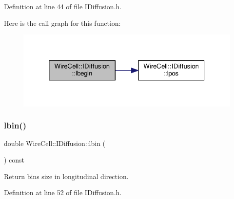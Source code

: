Definition at line 44 of file I\+Diffusion.\+h.

Here is the call graph for this function\+:
\nopagebreak
\begin{figure}[H]
\begin{center}
\leavevmode
\includegraphics[width=320pt]{class_wire_cell_1_1_i_diffusion_a554ef0f091287ae6e9f707a961f5a53c_cgraph}
\end{center}
\end{figure}
\mbox{\label{class_wire_cell_1_1_i_diffusion_ac82a15088681538902392c880666aa3e}} 
\subsubsection{\texorpdfstring{lbin()}{lbin()}}
{\footnotesize\ttfamily double Wire\+Cell\+::\+I\+Diffusion\+::lbin (\begin{DoxyParamCaption}{ }\end{DoxyParamCaption}) const\hspace{0.3cm}{\ttfamily [inline]}}



Return bins size in longitudinal direction. 



Definition at line 52 of file I\+Diffusion.\+h.

